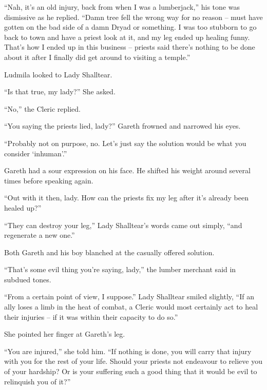  

“Nah, it’s an old injury, back from when I was a lumberjack,” his tone was dismissive as he replied. “Damn tree fell the wrong way for no reason – must have gotten on the bad side of a damn Dryad or something. I was too stubborn to go back to town and have a priest look at it, and my leg ended up healing funny. That’s how I ended up in this business – priests said there’s nothing to be done about it after I finally did get around to visiting a temple.”

 

Ludmila looked to Lady Shalltear.

 

“Is that true, my lady?” She asked.

 

“No,” the Cleric replied.

 

“You saying the priests lied, lady?” Gareth frowned and narrowed his eyes.

 

“Probably not on purpose, no. Let’s just say the solution would be what you consider ‘inhuman’.”

 

Gareth had a sour expression on his face. He shifted his weight around several times before speaking again.

 

“Out with it then, lady. How can the priests fix my leg after it’s already been healed up?”

 

“They can destroy your leg,” Lady Shalltear’s words came out simply, “and regenerate a new one.”

 

Both Gareth and his boy blanched at the casually offered solution.

 

“That’s some evil thing you’re saying, lady,” the lumber merchant said in subdued tones.

 

“From a certain point of view, I suppose.” Lady Shalltear smiled slightly, “If an ally loses a limb in the heat of combat, a Cleric would most certainly act to heal their injuries – if it was within their capacity to do so.”

 

She pointed her finger at Gareth’s leg.

 

“You are injured,” she told him. “If nothing is done, you will carry that injury with you for the rest of your life. Should your priests not endeavour to relieve you of your hardship? Or is your suffering such a good thing that it would be evil to relinquish you of it?”

